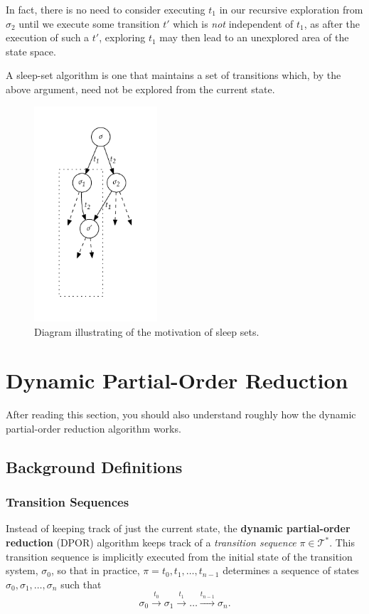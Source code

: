 \documentclass[12pt,a4paper,twoside,openright]{report}
\begin{document}
In fact, there is no need to consider executing
$t_1$ in our recursive exploration from $\sigma_2$
until we execute some transition $t'$ which is
\emph{not} independent of $t_1$, as after
the execution of such a $t'$, exploring $t_1$ may
then lead to an unexplored area of the state space.

A sleep-set algorithm is one that maintains a
set of transitions which, by the above argument,
need not be explored from the current state.

\begin{figure}
	\centering
	\includegraphics[height=8cm]{sleep}
	\caption{Diagram illustrating of the motivation
		of sleep sets.}
	\label{fig:sleep}
\end{figure}

\section{Dynamic Partial-Order Reduction}
\label{sec:dpor-prep}
After reading this section, you should
also understand roughly how the dynamic
partial-order reduction algorithm works.

\subsection{Background Definitions}

\subsubsection{Transition Sequences}
Instead of keeping track of just the current state,
the \textbf{dynamic partial-order reduction} (DPOR) algorithm
keeps track of a \emph{transition
sequence} $\pi \in \mathcal{T}^*$. This transition
sequence is implicitly executed from the initial state of
the transition system, $\sigma_0$, so that in practice,
$\pi = t_0, t_1, \ldots, t_{n-1}$ determines a sequence of states
$\sigma_0, \sigma_1, \ldots, \sigma_n$ such that
\[
	\sigma_0 \xrightarrow{\ t_0\ } \sigma_1 \xrightarrow{\ t_1\ }
	\ldots \xrightarrow{t_{n-1}} \sigma_n.
\]
\end{document}
